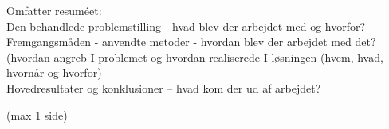 
Omfatter resuméet:\\
Den behandlede problemstilling - hvad blev der arbejdet med og hvorfor?\\
Fremgangsmåden - anvendte metoder - hvordan blev der arbejdet med det? \\
(hvordan angreb I problemet og hvordan realiserede I løsningen (hvem, hvad, hvornår og hvorfor)\\
Hovedresultater og konklusioner  – hvad kom der ud af arbejdet?\\
\begin{Large}
(max  1 side)
\end{Large}